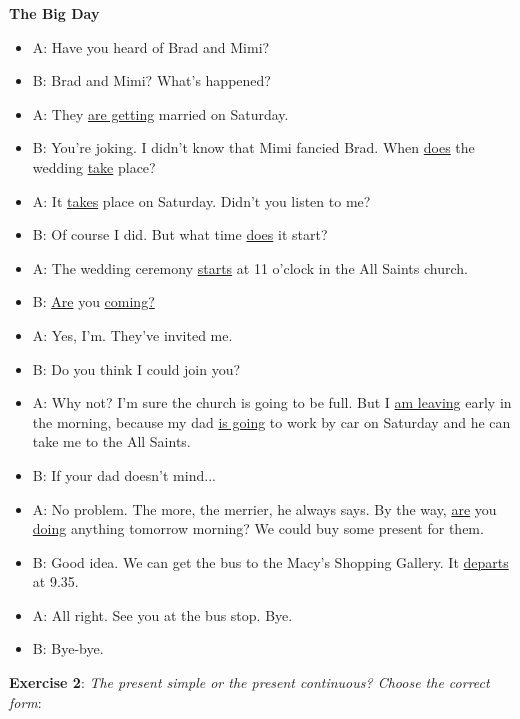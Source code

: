 \textbf{The Big Day}

\begin{itemize}

\item A: Have you heard of Brad and Mimi?
\item B: Brad and Mimi? What's happened?
\item A: They \underline{are getting} married on Saturday.
\item B: You're joking. I didn't know that Mimi fancied Brad. When \underline{does} the wedding \underline{take} place?
\item A: It \underline{takes} place on Saturday. Didn't you listen to me?
\item B: Of course I did. But what time \underline{does} it {start?}
\item A: The wedding ceremony \underline{starts} at 11 o'clock in the All Saints church.
\item B: \underline{Are} you \underline{coming?}
\item A: Yes, I'm. They've invited me. 
\item B: Do you think I could join you?
\item A: Why not? I'm sure the church is going to be full. But I \underline{am leaving} early in the morning, because my dad \underline{is going} to work by car on Saturday and he can take me to the All Saints.
\item B: If your dad doesn't mind...
\item A: No problem. The more, the merrier, he always says. By the way, \underline{are} you \underline{doing} anything tomorrow morning? We could buy some present for them. 
\item B: Good idea. We can get the bus to the Macy's Shopping Gallery. It \underline{departs} at 9.35.
\item A: All right. See you at the bus stop. Bye.
\item B: Bye-bye.

\end{itemize}

\textbf{Exercise 2}: \textit{The present simple or the present continuous? Choose the correct form}:

